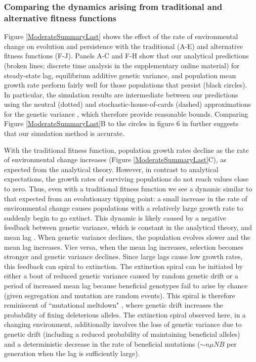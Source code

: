 \documentclass[12pt,letterpaper]{article} %
\begin{document}
\subsubsection*{Comparing the dynamics arising from traditional and alternative fitness functions}

Figure \ref{ModerateSummaryLast} shows the effect of the rate of environmental change on evolution and persistence with the traditional (A-E) and alternative fitness functions (F-J).
Panels A-C and F-H show that our analytical predictions (broken lines; discrete time analysis in the supplementary online material) for steady-state lag, equilibrium additive genetic variance, and population mean growth rate perform fairly well for those populations that persist (black circles).
In particular, the simulation results are intermediate between our predictions using the neutral (dotted) and stochastic-house-of-cards (dashed) approximations for the genetic variance \cite[equations 14 and 15 in][]{Burger1995}, which therefore provide reasonable bounds.
Comparing Figure \ref{ModerateSummaryLast}B to the circles in figure 6 in \cite{Burger1995} further suggests that our simulation method is accurate.

With the traditional fitness function, population growth rates decline as the rate of environmental change increases (Figure \ref{ModerateSummaryLast}C), as expected from the analytical theory.
However, in contrast to analytical expectations, the growth rates of surviving populations do not reach values close to zero.
Thus, even with a traditional fitness function we see a dynamic similar to that expected from an evolutionary tipping point: a small increase in the rate of environmental change causes populations with a relatively large growth rate to suddenly begin to go extinct.
This dynamic is likely caused by a negative feedback between genetic variance, which is constant in the analytical theory, and mean lag \citep[as described in][]{Burger1995}.
When genetic variance declines, the population evolves slower and the mean lag increases.
Vice versa, when the mean lag increases, selection becomes stronger and genetic variance declines.
Since large lags cause low growth rates, this feedback can spiral to extinction.
The extinction spiral can be initiated by either a bout of reduced genetic variance caused by random genetic drift or a period of increased mean lag because beneficial genotypes fail to arise by chance (given segregation and mutation are random events).    
This spiral is therefore reminiscent of ``mutational meltdown" \citep{Lynch1990}, where genetic drift increases the probability of fixing deleterious alleles.
The extinction spiral observed here, in a changing environment, additionally involves the loss of genetic variance due to genetic drift (including a reduced probability of maintaining beneficial alleles) and a deterministic decrease in the rate of beneficial mutations ($\sim n \mu N B$ per generation when the lag is sufficiently large).
\end{document}
